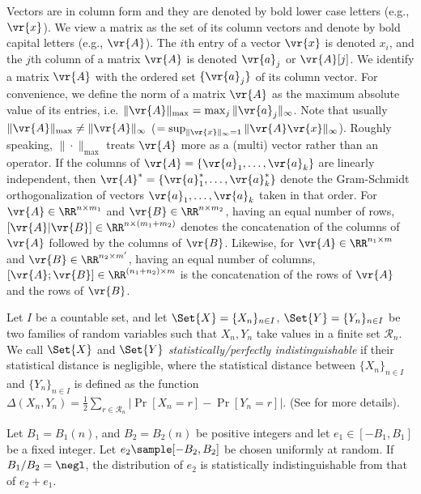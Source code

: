 \documentclass{fundam}
\begin{document}
Vectors are in column form and they are denoted by bold lower case letters (e.g., $\vr{x}$). We view a matrix as the set of its column vectors and denote by bold capital letters (e.g., $\vr{A}$). The $i$th entry of a vector $\vr{x}$ is denoted $x_{i}$, and the $j$th column of a matrix $\vr{A}$ is denoted $\vr{a}_{j}$ or $\vr{A}[j]$. We identify a matrix $\vr{A}$ with the ordered set $\{\vr{a}_{j}\}$ of its column vector. For convenience, we define the norm of a matrix $\vr{A}$ as the maximum absolute value of its entries, i.e. $\|\vr{A}\|_{\max} = \max_{j}\|\vr{a}_{j}\|_{\infty}$. Note that usually $\|\vr{A}\|_{\max} \neq \|\vr{A} \|_{\infty} $ ($=\sup_{\|\vr{x}\|_{\infty}=1}\|\vr{A}\vr{x}\|_{\infty}$). Roughly speaking, $\|\cdot \|_{\max}$ treats $\vr{A}$ more as a (multi) vector rather than an operator. If the columns of $\vr{A} = \{ \vr{a}_{1}, \ldots ,  \vr{a}_{k} \}$ are linearly independent, then $\vr{A}^{*} = \{ \vr{a}_{1}^{*}, \ldots ,  \vr{a}_{k}^{*} \} $ denote the Gram-Schmidt orthogonalization of vectors $\vr{a}_{1}, \ldots ,  \vr{a}_{k}$ taken in that order. For $\vr{A}\in\RR^{n\times m_{1}}$ and $\vr{B}\in\RR^{n\times m_{2}}$, having an equal number of rows, $[\vr{A}|\vr{B}]\in\RR^{n\times (m_{1}+m_{2})}$ denotes the concatenation of the columns of $\vr{A}$ followed by the columns of $\vr{B}$. Likewise, for  $\vr{A}\in\RR^{n_{1}\times m}$ and $\vr{B}\in\RR^{n_{2}\times m'}$, having an equal number of columns, $[\vr{A};\vr{B}]\in\RR^{(n_{1}+n_{2})\times m}$ is the concatenation of the rows of $\vr{A}$ and the rows of $\vr{B}$.

Let $I$ be a countable set, and let $\Set{X}=\{X_{n}\}_{n\in I}$, $\Set{Y}=\{Y_{n}\}_{n\in I}$ be two families of random variables such that $X_{n}, Y_{n}$ take values in a finite set $\mathcal{R}_{n}$. We call $\Set{X}$ and $\Set{Y}$ \textit{statistically/perfectly indistinguishable} if  their statistical distance is negligible, where the statistical distance between $\{X_{n}\}_{n\in I}$ and $\{Y_{n}\}_{n\in I}$ is defined as the function
	$\Delta(X_{n}, Y_{n}) = \frac{1}{2}\sum_{r\in \mathcal{R}_{n}} \left| \Pr[X_{n}=r] - \Pr[Y_{n}=r]  \right|.$
(See \cite{goldreich2001foundations} for more details).

\begin{lemma}\label{lem::smudging}
	Let $B_{1}=B_{1}(n)$, and $B_{2}=B_{2}(n)$ be positive integers and let $e_{1}\in [-B_{1}, B_{1}]$ be a fixed integer. Let $e_{2}\sample [-B_{2}, B_{2}]$ be chosen uniformly at random. If $B_{1}/B_{2}=\negl$, the distribution of $e_{2}$ is statistically indistinguishable from that of $e_{2}+e_{1}$.
\end{lemma}	
\end{document}
